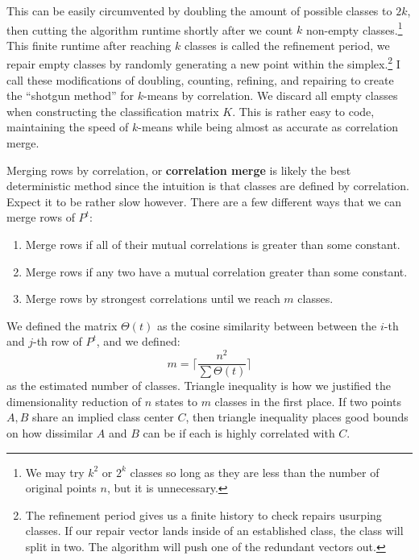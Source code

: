 \documentclass[10pt, a5paper, twoside, openright]{memoir}
\begin{document}
This can be easily circumvented by doubling the amount of possible classes to $2k$, then cutting the algorithm runtime shortly after we count $k$ non-empty classes.\footnote{We may try $k^2$ or $2^k$ classes so long as they are less than the number of original points $n$, but it is unnecessary.} This finite runtime after reaching $k$ classes is called the refinement period, we repair empty classes by randomly generating a new point within the simplex.\footnote{The refinement period gives us a finite history to check repairs usurping classes. If our repair vector lands inside of an established class, the class will split in two. The algorithm will push one of the redundant vectors out.} I call these modifications of doubling, counting, refining, and repairing to create the ``shotgun method'' for $k$-means by correlation. We discard all empty classes when constructing the classification matrix $K$. This is rather easy to code, maintaining the speed of $k$-means while being almost as accurate as correlation merge.

Merging rows by correlation, or \textbf{correlation merge} is likely the best deterministic method since the intuition is that classes are defined by correlation. Expect it to be rather slow however. There are a few different ways that we can merge rows of $P^t$:
\begin{enumerate}
\item Merge rows if all of their mutual correlations is greater than some constant.
\item Merge rows if any two have a mutual correlation greater than some constant.
\item Merge rows by strongest correlations until we reach $m$ classes.
\end{enumerate}
We defined the matrix $\Theta(t)$ as the cosine similarity between between the $i$-th and $j$-th row of $P^t$, and we defined:
$$m = \bigg \lceil \frac{n^2}{\sum \Theta(t)} \bigg \rceil$$
as the estimated number of classes. Triangle inequality is how we justified the dimensionality reduction of $n$ states to $m$ classes in the first place. If two points $A, B$ share an implied class center $C$, then triangle inequality places good bounds on how dissimilar $A$ and $B$ can be if each is highly correlated with $C$.
\end{document}
